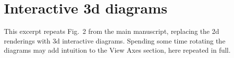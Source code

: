 \documentclass{bmcart}
\begin{document}
\begin{frontmatter}
\begin{fmbox}
\begin{artnotes}
\end{artnotes}

\end{fmbox}%


\end{frontmatter}



\section*{Interactive 3d diagrams}

This excerpt repeats Fig.~2 from the main manuscript, replacing the 2d renderings with 3d interactive diagrams. Spending some time rotating the diagrams may add intuition to the View Axes section, here repeated in full.
\end{document}
